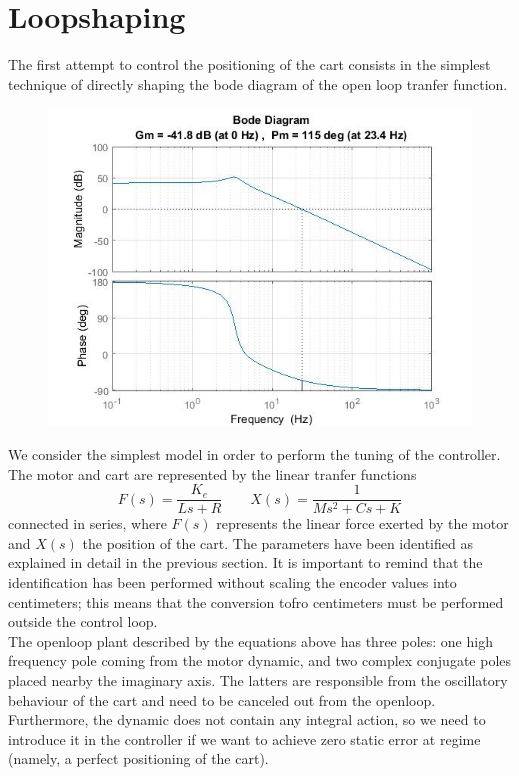 \section{Loopshaping}
The first attempt to control the positioning of the cart consists in the simplest technique of directly shaping the bode diagram of the open loop tranfer function. 

\begin{figure}[h]
\includegraphics[width=\textwidth]{img/bode_ol.jpg}
\end{figure}

We consider the simplest model in order to perform the tuning of the controller. The motor and cart are represented by the linear tranfer functions 
\begin{equation}
F(s) = \frac{K_e}{Ls+R} \qquad X(s) = \frac{1}{Ms^2+Cs+K}
\end{equation}
connected in series, where $F(s)$ represents the linear force exerted by the motor and $X(s)$ the position of the cart. The parameters have been identified as explained in detail in the previous section. It is important to remind that the identification has been performed without scaling the encoder values into centimeters; this means that the conversion tofro centimeters must be performed outside the control loop.\\

The openloop plant described by the equations above has three poles: one high frequency pole coming from the motor dynamic, and two complex conjugate poles placed nearby the imaginary axis. The latters are responsible from the oscillatory behaviour of the cart and need to be canceled out from the openloop. Furthermore, the dynamic does not contain any integral action, so we need to introduce it in the controller if we want to achieve zero static error at regime (namely, a perfect positioning of the cart).\\


